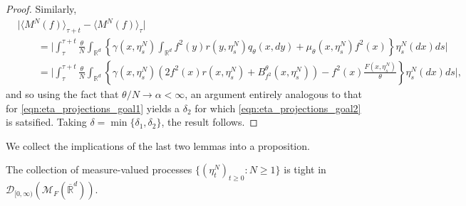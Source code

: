 \documentclass[EJP]{ejpecp} %
\newcommand{\IR}{\mathbb R}
\newcommand{\cmeasures}{\mathcal{M}_F(\overline{\IR}^d)} %
\begin{document}
\begin{proof}
Similarly,
\begin{align*}
    &
 \big|   \langle M^{N}(f) \rangle_{\tau + t} 
        - \langle M^{N}(f) \rangle_\tau \big|
    \\ & \qquad =
  \Big|  \int_{\tau}^{\tau + t}
        \frac{\theta}{N}
        \int_{\IR^d}
        \left\{
            \gamma(x, \eta^N_s)
            \int_{\IR^d} f^2(y) r(y, \eta^N_s) q_\theta(x, dy)
            +
            \mu_\theta(x, \eta^N_s) f^2(x)
        \right\}
        \eta^N_s(dx)
    ds \Big|
    \\ & \qquad =
   \Big| \int_{\tau}^{\tau + t}
        \frac{\theta}{N}
        \int_{\IR^d}
        \left\{
            \gamma(x, \eta^N_s)
            \left(
                2 f^2(x) r(x, \eta^N_s)
                +
                B^\theta_{f^2}(x, \eta^N_s)
            \right)
            -
            f^2(x) \frac{F(x, \eta^N_s)}{ \theta}
        \right\}
        \eta^N_s(dx)
    ds\Big| ,
\end{align*}
and so using the fact that $\theta/N \to \alpha < \infty$,
an argument entirely analogous to 
that for \eqref{eqn:eta_projections_goal1}
yields a $\delta_2$ for which \eqref{eqn:eta_projections_goal2} is
satsified. Taking $\delta=\min\{\delta_1,\delta_2\}$, the result follows.

\end{proof}


We collect the implications of the last two lemmas into a proposition.

\begin{proposition}
\label{tightness in one point compactification}
    The collection of measure-valued processes 
    $\{(\eta^{N}_t)_{t \geq 0}: N \geq 1\}$
    is tight in $\mathcal{D}_{[0,\infty)}(\cmeasures)$.
\end{proposition}
\end{document}
